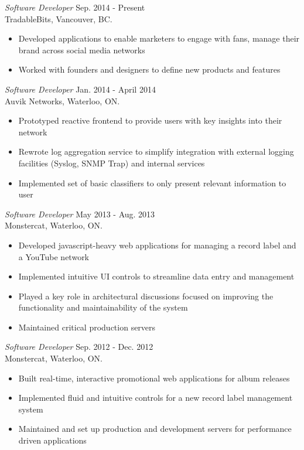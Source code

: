 \documentclass[margin]{res}
\begin{document}
\begin{resume}
{\sl Software Developer} \hfill Sep. 2014 - Present \\
TradableBits, Vancouver, BC.
\begin{itemize}  \itemsep -2pt %
			\item Developed applications to enable marketers to engage with fans, manage their brand across social media networks
			\item Worked with founders and designers to define new products and features
\end{itemize}

{\sl Software Developer} \hfill Jan. 2014 - April 2014 \\
Auvik Networks, Waterloo, ON.
\begin{itemize}  \itemsep -2pt %
  \item Prototyped reactive frontend to provide users with key insights into their network
	\item Rewrote log aggregation service to simplify integration with external logging facilities (Syslog, SNMP Trap) and internal services
  \item Implemented set of basic classifiers to only present relevant information to user
\end{itemize}

{\sl Software Developer} \hfill May 2013 - Aug. 2013 \\
Monstercat, Waterloo, ON.
\begin{itemize}  \itemsep -2pt %
  \item Developed javascript-heavy web applications for managing a record label and a YouTube network
  \item Implemented intuitive UI controls to streamline data entry and management
  \item Played a key role in architectural discussions focused on improving the functionality and maintainability of the system
  \item Maintained critical production servers
\end{itemize}

{\sl Software Developer} \hfill Sep. 2012 - Dec. 2012 \\
Monstercat, Waterloo, ON.
\begin{itemize}  \itemsep -2pt %
  \item Built real-time, interactive promotional web applications for album releases
  \item Implemented fluid and intuitive controls for a new record label management system
  \item Maintained and set up production and development servers for performance driven applications
\end{itemize}


\end{resume}
\end{document}
